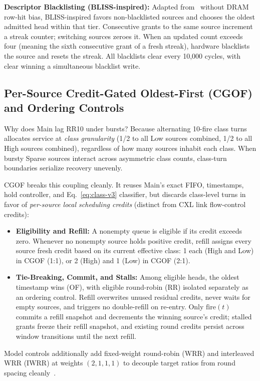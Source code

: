 \textbf{Descriptor Blacklisting (BLISS-inspired):} Adapted from~\cite{bliss} without DRAM row-hit bias, BLISS-inspired favors non-blacklisted sources and chooses the oldest admitted head within that tier. Consecutive grants to the same source increment a streak counter; switching sources zeroes it. When an updated count exceeds four (meaning the sixth consecutive grant of a fresh streak), hardware blacklists the source and resets the streak. All blacklists clear every 10,000 cycles, with clear winning a simultaneous blacklist write.

\subsection{Per-Source Credit-Gated Oldest-First (CGOF) and Ordering Controls}
Why does Main lag RR10 under bursts? Because alternating 10-fire class turns allocates service at \emph{class granularity} (1/2 to all Low sources combined, 1/2 to all High sources combined), regardless of how many sources inhabit each class. When bursty Sparse sources interact across asymmetric class counts, class-turn boundaries serialize recovery unevenly.

CGOF breaks this coupling cleanly. It reuses Main's exact FIFO, timestamps, hold controller, and Eq.~\eqref{eq:class-v3} classifier, but discards class-level turns in favor of \emph{per-source local scheduling credits} (distinct from CXL link flow-control credits):
\begin{itemize}
\item \textbf{Eligibility and Refill:} A nonempty queue is eligible if its credit exceeds zero. Whenever no nonempty source holds positive credit, refill assigns every source fresh credit based on its current effective class: 1 each (High and Low) in CGOF (1:1), or 2 (High) and 1 (Low) in CGOF (2:1).
\item \textbf{Tie-Breaking, Commit, and Stalls:} Among eligible heads, the oldest timestamp wins (OF), with eligible round-robin (RR) isolated separately as an ordering control. Refill overwrites unused residual credits, never waits for empty sources, and triggers no double-refill on re-entry. Only $\mathrm{fire}(t)$ commits a refill snapshot and decrements the winning source's credit; stalled grants freeze their refill snapshot, and existing round credits persist across window transitions until the next refill.
\end{itemize}
Model controls additionally add fixed-weight round-robin (WRR) and interleaved WRR (IWRR) at weights $(2,1,1,1)$ to decouple target ratios from round spacing cleanly~\cite{wrr_mandal}.

